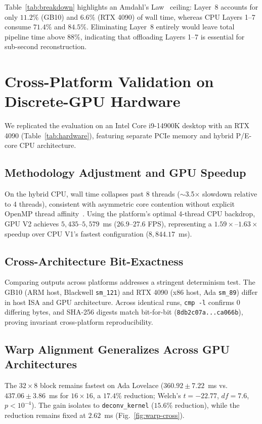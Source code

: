 \documentclass[conference]{IEEEtran}
\begin{document}
Table~\ref{tab:breakdown} highlights an Amdahl's Law~\cite{amdahl1967} ceiling: Layer~8 accounts for only $11.2\%$ (GB10) and $6.6\%$ (RTX 4090) of wall time, whereas CPU Layers 1--7 consume $71.4\%$ and $84.5\%$. Eliminating Layer~8 entirely would leave total pipeline time above $88\%$, indicating that offloading Layers 1--7 is essential for sub-second reconstruction.

\section{Cross-Platform Validation on Discrete-GPU Hardware}
\label{sec:rtx4090}

We replicated the evaluation on an Intel Core i9-14900K desktop with an RTX 4090 (Table~\ref{tab:hardware}), featuring separate PCIe memory and hybrid P/E-core CPU architecture.

\subsection{Methodology Adjustment and GPU Speedup}
On the hybrid CPU, wall time collapses past 8 threads ($\sim$3.5$\times$ slowdown relative to 4 threads), consistent with asymmetric core contention without explicit OpenMP thread affinity~\cite{eichenberger2012ompaffinity}. Using the platform's optimal 4-thread CPU backdrop, GPU V2 achieves $5{,}435$--$5{,}579$~ms ($26.9$--$27.6$ FPS), representing a $1.59\times$--$1.63\times$ speedup over CPU V1's fastest configuration ($8{,}844.17$~ms).

\subsection{Cross-Architecture Bit-Exactness}
\label{sec:cross-arch-bitexact}
Comparing outputs across platforms addresses a stringent determinism test. The GB10 (ARM host, Blackwell \texttt{sm\_121}) and RTX 4090 (x86 host, Ada \texttt{sm\_89}) differ in host ISA and GPU architecture. Across identical runs, \texttt{cmp -l} confirms 0 differing bytes, and SHA-256 digests match bit-for-bit (\texttt{8db2c07a...ca066b}), proving invariant cross-platform reproducibility.

\subsection{Warp Alignment Generalizes Across GPU Architectures}
\label{sec:warp-generalize}
The $32{\times}8$ block remains fastest on Ada Lovelace ($360.92 \pm 7.22$~ms vs. $437.06 \pm 3.86$~ms for $16{\times}16$, a $17.4\%$ reduction; Welch's $t = -22.77$, $df = 7.6$, $p < 10^{-4}$). The gain isolates to \texttt{deconv\_kernel} ($15.6\%$ reduction), while the reduction remains fixed at $2.62$~ms (Fig.~\ref{fig:warp-cross}).
\end{document}
